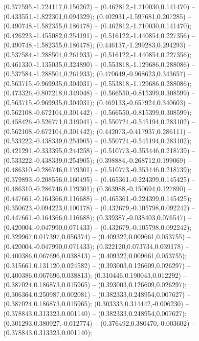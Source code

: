  (0.377595,-1.724117,0.156262) -- (0.462812,-1.710030,0.141470) -- (0.433551,-1.822301,0.094329);
 (0.402931,-1.597681,0.207285) -- (0.490748,-1.582355,0.186478) -- (0.462812,-1.710030,0.141470);
 (0.426223,-1.455082,0.254191) -- (0.516122,-1.440854,0.227356) -- (0.490748,-1.582355,0.186478);
 (0.446137,-1.299283,0.294293) -- (0.537584,-1.288504,0.261933) -- (0.516122,-1.440854,0.227356);
 (0.461330,-1.135035,0.324890) -- (0.553818,-1.129686,0.288086) -- (0.537584,-1.288504,0.261933);
 (0.470649,-0.968623,0.343657) -- (0.563715,-0.969935,0.304031) -- (0.553818,-1.129686,0.288086);
 (0.473326,-0.807218,0.349048) -- (0.566550,-0.815399,0.308599) -- (0.563715,-0.969935,0.304031);
 (0.469133,-0.657924,0.340603) -- (0.562108,-0.672104,0.301442) -- (0.566550,-0.815399,0.308599);
 (0.458426,-0.526771,0.319041) -- (0.550724,-0.545194,0.283102) -- (0.562108,-0.672104,0.301442);
 (0.442073,-0.417937,0.286111) -- (0.533222,-0.438339,0.254905) -- (0.550724,-0.545194,0.283102);
 (0.421291,-0.333395,0.244258) -- (0.510773,-0.353446,0.218739) -- (0.533222,-0.438339,0.254905);
 (0.398884,-0.268712,0.199069) -- (0.486310,-0.286746,0.179301) -- (0.510773,-0.353446,0.218739);
 (0.379893,-0.208556,0.160495) -- (0.465361,-0.224399,0.145425) -- (0.486310,-0.286746,0.179301);
 (0.363988,-0.150694,0.127890) -- (0.447661,-0.164366,0.116688) -- (0.465361,-0.224399,0.145425);
 (0.350623,-0.094223,0.100178) -- (0.432679,-0.105798,0.092242) -- (0.447661,-0.164366,0.116688);
 (0.339387,-0.038403,0.076547) -- (0.420004,-0.047990,0.071433) -- (0.432679,-0.105798,0.092242);
 (0.329967,0.017397,0.056374) -- (0.409322,0.009661,0.053755) -- (0.420004,-0.047990,0.071433);
 (0.322120,0.073734,0.039178) -- (0.400386,0.067696,0.038813) -- (0.409322,0.009661,0.053755);
 (0.315661,0.131120,0.024582) -- (0.393003,0.126609,0.026297) -- (0.400386,0.067696,0.038813);
 (0.310446,0.190043,0.012292) -- (0.387024,0.186873,0.015965) -- (0.393003,0.126609,0.026297);
 (0.306364,0.250987,0.002081) -- (0.382333,0.248954,0.007627) -- (0.387024,0.186873,0.015965);
 (0.303333,0.314442,-0.006230) -- (0.378843,0.313323,0.001140) -- (0.382333,0.248954,0.007627);
 (0.301293,0.380927,-0.012774) -- (0.376492,0.380470,-0.003602) -- (0.378843,0.313323,0.001140);
